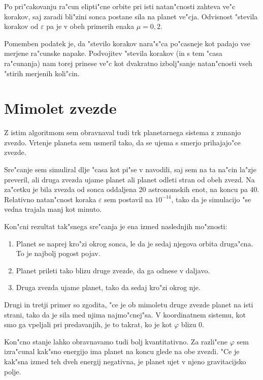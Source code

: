 \documentclass[a4paper,10pt]{article}
\newcommand{\eps}{\varepsilon}
\begin{document}
Po pri"cakovanju ra"cun elipti"cne orbite pri isti natan"cnosti zahteva ve"c korakov, saj zaradi bli"zini sonca postane sila na planet ve"cja. Odvisnost "stevila korakov od $\eps$ pa je v obeh primerih enaka $\mu = 0,2$. 

Pomemben podatek je, da "stevilo korakov nara"s"ca po"casneje kot padajo vse merjene ra"cunske napake. Podvojitev "stevila korakov (in s tem "casa ra"cunanja) nam torej prinese ve"c kot dvakratno izbolj"sanje natan"cnosti vseh "stirih merjenih koli"cin. 

\newpage
\section{Mimolet zvezde}

Z istim algoritmom sem obravnaval tudi trk planetarnega sistema z zunanjo zvezdo. Vrtenje planeta sem usmeril tako, da se ujema s smerjo prihajajo"ce zvezde. 

Sre"canje sem simuliral dlje "casa kot pi"se v navodili, saj sem na ta na"cin la"zje preveril, ali druga zvezda ujame planet ali planet odleti stran od obeh zvezd. Na za"cetku je bila zvezda od sonca oddaljena 20 astronomskih enot, na koncu pa 40. Relativno natan"cnost koraka $\eps$ sem postavil na $10^{-14}$, tako da je simulacijo "se vedna trajala manj kot minuto. 

Kon"cni rezultat tak"snega sre"canja je ena izmed naslednjih mo"znosti:

\begin{enumerate}
 \item Planet se naprej kro"zi okrog sonca, le da je sedaj njegova orbita druga"cna. To je najbolj pogost pojav. 
 \item Planet prileti tako blizu druge zvezde, da ga odnese v daljavo. 
 \item Druga zvezda ujame planet, tako da sedaj kro"zi okrog nje. 
\end{enumerate}

Drugi in tretji primer so zgodita, "ce je ob mimoletu druge zvezde planet na isti strani, tako da je sila med njima najmo"cnej"sa. V koordinatnem sistemu, kot smo ga vpeljali pri predavanjih, je to takrat, ko je kot $\varphi$ blizu 0. 

Kon"cno stanje lahko obravnavamo tudi bolj kvantitativno. Za razli"cne $\varphi$ sem izra"cunal kak"sno energijo ima planet na koncu glede na obe zvezdi. "Ce je kak"sna izmed teh dveh energij negativna, je planet ujet v njeno gravitacijsko polje. 
\end{document}
